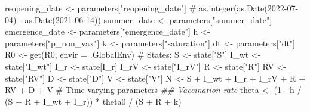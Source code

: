 \documentclass[
  11pt,
  letterpaper,
  DIV=11,
  numbers=noendperiod]{scrartcl}
\newenvironment{Shaded}{\begin{snugshade}}{\end{snugshade}}
\newcommand{\AttributeTok}[1]{\textcolor[rgb]{0.40,0.45,0.13}{#1}}
\newcommand{\CommentTok}[1]{\textcolor[rgb]{0.37,0.37,0.37}{#1}}
\newcommand{\DecValTok}[1]{\textcolor[rgb]{0.68,0.00,0.00}{#1}}
\newcommand{\DocumentationTok}[1]{\textcolor[rgb]{0.37,0.37,0.37}{\textit{#1}}}
\newcommand{\FunctionTok}[1]{\textcolor[rgb]{0.28,0.35,0.67}{#1}}
\newcommand{\NormalTok}[1]{\textcolor[rgb]{0.00,0.23,0.31}{#1}}
\newcommand{\OtherTok}[1]{\textcolor[rgb]{0.00,0.23,0.31}{#1}}
\newcommand{\SpecialCharTok}[1]{\textcolor[rgb]{0.37,0.37,0.37}{#1}}
\newcommand{\StringTok}[1]{\textcolor[rgb]{0.13,0.47,0.30}{#1}}
\begin{document}
\begin{Shaded}
\begin{Highlighting}[]
\NormalTok{    reopening\_date   }\OtherTok{\textless{}{-}}\NormalTok{ parameters[}\StringTok{"reopening\_date"}\NormalTok{]}
    \CommentTok{\# as.integer(as.Date(\textquotesingle{}2022{-}07{-}04\textquotesingle{}) {-} as.Date(\textquotesingle{}2021{-}06{-}14\textquotesingle{}))}
\NormalTok{    summer\_date      }\OtherTok{\textless{}{-}}\NormalTok{ parameters[}\StringTok{"summer\_date"}\NormalTok{]}
\NormalTok{    emergence\_date      }\OtherTok{\textless{}{-}}\NormalTok{ parameters[}\StringTok{"emergence\_date"}\NormalTok{]}
\NormalTok{    h       }\OtherTok{\textless{}{-}}\NormalTok{ parameters[}\StringTok{"p\_non\_vax"}\NormalTok{]}
\NormalTok{    k       }\OtherTok{\textless{}{-}}\NormalTok{ parameters[}\StringTok{"saturation"}\NormalTok{]}
\NormalTok{    dt      }\OtherTok{\textless{}{-}}\NormalTok{ parameters[}\StringTok{"dt"}\NormalTok{]}
\NormalTok{    R0     }\OtherTok{\textless{}{-}} \FunctionTok{get}\NormalTok{(}\StringTok{\textquotesingle{}R0\textquotesingle{}}\NormalTok{, }\AttributeTok{envir =}\NormalTok{ .GlobalEnv)}
    \CommentTok{\# States:}
\NormalTok{    S    }\OtherTok{\textless{}{-}}\NormalTok{ state[}\StringTok{"S"}\NormalTok{]}
\NormalTok{    I\_wt }\OtherTok{\textless{}{-}}\NormalTok{ state[}\StringTok{"I\_wt"}\NormalTok{]}
\NormalTok{    I\_r  }\OtherTok{\textless{}{-}}\NormalTok{ state[}\StringTok{\textquotesingle{}I\_r\textquotesingle{}}\NormalTok{]}
\NormalTok{    I\_rV }\OtherTok{\textless{}{-}}\NormalTok{ state[}\StringTok{"I\_rV"}\NormalTok{]}
\NormalTok{    R    }\OtherTok{\textless{}{-}}\NormalTok{ state[}\StringTok{"R"}\NormalTok{]}
\NormalTok{    RV   }\OtherTok{\textless{}{-}}\NormalTok{ state[}\StringTok{"RV"}\NormalTok{]}
\NormalTok{    D    }\OtherTok{\textless{}{-}}\NormalTok{ state[}\StringTok{"D"}\NormalTok{]}
\NormalTok{    V    }\OtherTok{\textless{}{-}}\NormalTok{ state[}\StringTok{"V"}\NormalTok{]}
\NormalTok{    N }\OtherTok{\textless{}{-}}\NormalTok{  S }\SpecialCharTok{+}\NormalTok{ I\_wt }\SpecialCharTok{+}\NormalTok{ I\_r }\SpecialCharTok{+}\NormalTok{ I\_rV }\SpecialCharTok{+}\NormalTok{ R }\SpecialCharTok{+}\NormalTok{ RV }\SpecialCharTok{+}\NormalTok{ D }\SpecialCharTok{+}\NormalTok{ V}
    \CommentTok{\# Time{-}varying parameters}
    \DocumentationTok{\#\# Vaccination rate}
\NormalTok{    theta }\OtherTok{\textless{}{-}}\NormalTok{ (}\DecValTok{1} \SpecialCharTok{{-}}\NormalTok{ h }\SpecialCharTok{/}\NormalTok{ (S }\SpecialCharTok{+}\NormalTok{ R }\SpecialCharTok{+}\NormalTok{ I\_wt }\SpecialCharTok{+}\NormalTok{ I\_r)) }\SpecialCharTok{*}\NormalTok{ theta0 }\SpecialCharTok{/}\NormalTok{ (S }\SpecialCharTok{+}\NormalTok{ R }\SpecialCharTok{+}\NormalTok{ k)}

\end{Highlighting}
\end{Shaded}
\end{document}
